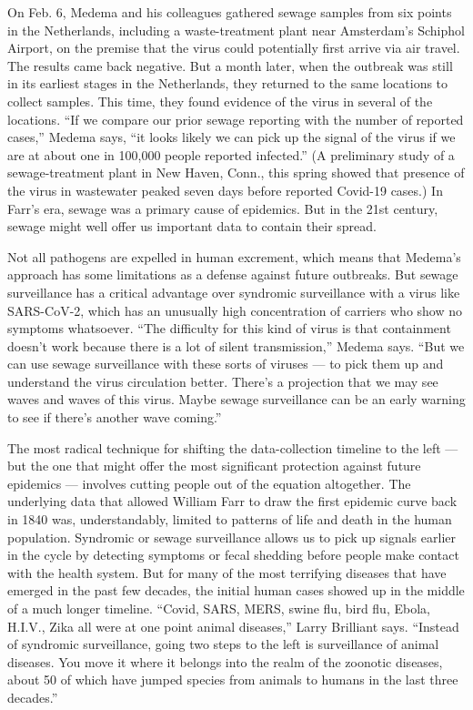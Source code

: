 On Feb. 6, Medema and his colleagues gathered sewage samples from six
points in the Netherlands, including a waste-treatment plant near
Amsterdam's Schiphol Airport, on the premise that the virus could
potentially first arrive via air travel. The results came back negative.
But a month later, when the outbreak was still in its earliest stages in
the Netherlands, they returned to the same locations to collect samples.
This time, they found evidence of the virus in several of the locations.
``If we compare our prior sewage reporting with the number of reported
cases,'' Medema says, ``it looks likely we can pick up the signal of the
virus if we are at about one in 100,000 people reported infected.'' (A
preliminary study of a sewage-treatment plant in New Haven, Conn., this
spring showed that presence of the virus in wastewater peaked seven days
before reported Covid-19 cases.) In Farr's era, sewage was a primary
cause of epidemics. But in the 21st century, sewage might well offer us
important data to contain their spread.

Not all pathogens are expelled in human excrement, which means that
Medema's approach has some limitations as a defense against future
outbreaks. But sewage surveillance has a critical advantage over
syndromic surveillance with a virus like SARS-CoV-2, which has an
unusually high concentration of carriers who show no symptoms
whatsoever. ``The difficulty for this kind of virus is that containment
doesn't work because there is a lot of silent transmission,'' Medema
says. ``But we can use sewage surveillance with these sorts of viruses
--- to pick them up and understand the virus circulation better. There's
a projection that we may see waves and waves of this virus. Maybe sewage
surveillance can be an early warning to see if there's another wave
coming.''

The most radical technique for shifting the data-collection timeline to
the left --- but the one that might offer the most significant
protection against future epidemics --- involves cutting people out of
the equation altogether. The underlying data that allowed William Farr
to draw the first epidemic curve back in 1840 was, understandably,
limited to patterns of life and death in the human population. Syndromic
or sewage surveillance allows us to pick up signals earlier in the cycle
by detecting symptoms or fecal shedding before people make contact with
the health system. But for many of the most terrifying diseases that
have emerged in the past few decades, the initial human cases showed up
in the middle of a much longer timeline. ``Covid, SARS, MERS, swine flu,
bird flu, Ebola, H.I.V., Zika all were at one point animal diseases,''
Larry Brilliant says. ``Instead of syndromic surveillance, going two
steps to the left is surveillance of animal diseases. You move it where
it belongs into the realm of the zoonotic diseases, about 50 of which
have jumped species from animals to humans in the last three decades.''

